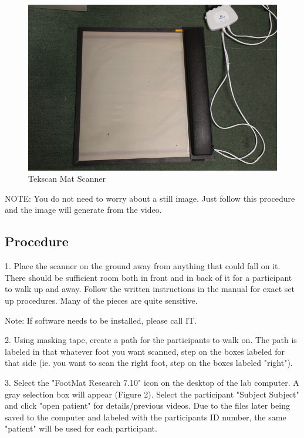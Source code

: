 \begin{figure}[!htp]
\centering
\includegraphics[scale=0.35]{Mat}
\caption{Tekscan Mat Scanner}
\label{Image 1}
\end{figure}

NOTE: You do not need to worry about a still image. Just follow this procedure and the image will generate from the video.

\subsection{Procedure}

1.	Place the scanner on the ground away from anything that could fall on it. There should be sufficient room both in front and in back of it for a participant to walk up and away. Follow the written instructions in the manual for exact set up procedures. Many of the pieces are quite sensitive. 

Note: If software needs to be installed, please call IT. 



2.  Using masking tape, create a path for the participants to walk on. The path is labeled in that whatever foot you want scanned, step on the boxes labeled for that side (ie. you want to scan the right foot, step on the boxes labeled "right").   
 
3. Select the "FootMat Research 7.10" icon on the desktop of the lab computer. A gray selection box will appear (Figure 2). Select the participant "Subject Subject" and click "open patient" for details/previous videos. Due to the files later being saved to the computer and labeled with the participants ID number, the same "patient" will be used for each participant.

